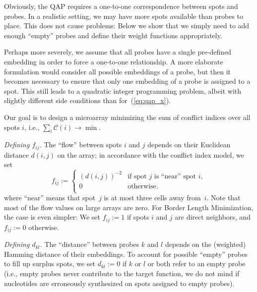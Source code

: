 \documentclass{bioinfo}
\newcommand{\paragraph}[1]{\par\textit{#1}}
\begin{document}
Obviously, the QAP requires a one-to-one correspondence between spots and
probes. In a realistic setting, we may have more spots available than probes
to place. This does not cause problems: Below we show that we simply need to
add enough ``empty'' probes and define their weight functions appropriately.

Perhaps more severely, we assume that all probes have a single pre-defined
embedding in order to force a one-to-one relationship.  A more elaborate
formulation would consider all possible embeddings of a probe, but then it
becomes necessary to ensure that only one embedding of a probe is assigned to
a spot. This still leads to a quadratic integer programming problem, albeit
with slightly different side conditions than for~(\ref{eq:qap_x}).

Our goal is to design a microarray minimizing the sum of conflict indices over
all spots $i$, i.e., $\sum_{i} \mathcal{C}(i) \to \min$.


\paragraph{Defining $f_{ij}$.}
The ``flow'' between spots $i$ and $j$ depends on their Euclidean distance
$d(i,j)$ on the array; in accordance with the conflict index model, we set
\begin{equation}
  f_{ij} := \left\{ \begin{array}{ll}
      (d(i,j))^{-2} & \mbox{if spot $j$ is ``near'' spot $i$}, \\
      0 & \mbox{otherwise}. \\
    \end{array} \right.
\end{equation}
where ``near'' means that spot~$j$ is at most three cells away from~$i$. Note
that most of the flow values on large arrays are zero. For Border Length
Minimization, the case is even simpler: We set $f_{ij}:=1$ if spots $i$ and
$j$ are direct neighbors, and $f_{ij}:=0$ otherwise.

\paragraph{Defining $d_{kl}$.}
The ``distance'' between probes $k$ and $l$ depends on the (weighted) Hamming
distance of their embeddings. To account for possible ``empty'' probes to fill
up surplus spots, we set $d_{kl}:=0$ if $k$ or $l$ or both refer to an empty
probe (i.e., empty probes never contribute to the target function, we do not
mind if nucleotides are erroneously synthesized on spots assigned to empty
probes). 
\end{document}
